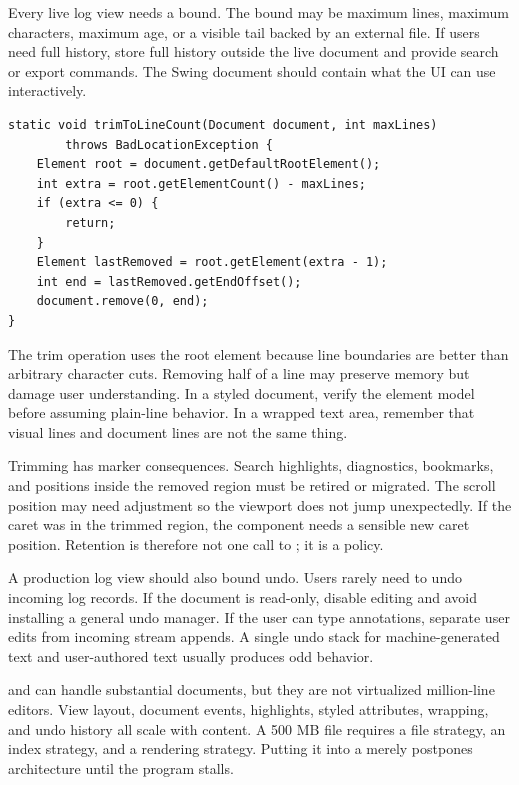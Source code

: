 Every live log view needs a bound. The bound may be maximum lines, maximum characters, maximum age, or a visible tail backed by an external file. If users need full history, store full history outside the live document and provide search or export commands. The Swing document should contain what the UI can use interactively.

\begin{lstlisting}[caption={Trimming a document by line count using the root element.}]
static void trimToLineCount(Document document, int maxLines)
        throws BadLocationException {
    Element root = document.getDefaultRootElement();
    int extra = root.getElementCount() - maxLines;
    if (extra <= 0) {
        return;
    }
    Element lastRemoved = root.getElement(extra - 1);
    int end = lastRemoved.getEndOffset();
    document.remove(0, end);
}
\end{lstlisting}

The trim operation uses the root element because line boundaries are better than arbitrary character cuts. Removing half of a line may preserve memory but damage user understanding. In a styled document, verify the element model before assuming plain-line behavior. In a wrapped text area, remember that visual lines and document lines are not the same thing.

Trimming has marker consequences. Search highlights, diagnostics, bookmarks, and positions inside the removed region must be retired or migrated. The scroll position may need adjustment so the viewport does not jump unexpectedly. If the caret was in the trimmed region, the component needs a sensible new caret position. Retention is therefore not one call to ; it is a policy.

A production log view should also bound undo. Users rarely need to undo incoming log records. If the document is read-only, disable editing and avoid installing a general undo manager. If the user can type annotations, separate user edits from incoming stream appends. A single undo stack for machine-generated text and user-authored text usually produces odd behavior.

 and  can handle substantial documents, but they are not virtualized million-line editors. View layout, document events, highlights, styled attributes, wrapping, and undo history all scale with content. A 500 MB file requires a file strategy, an index strategy, and a rendering strategy. Putting it into a  merely postpones architecture until the program stalls.

